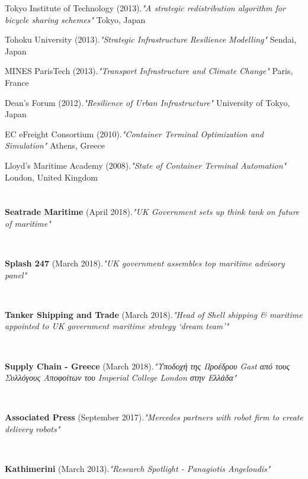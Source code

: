 \documentclass[margin]{res}
\begin{document}
\begin{resume}
\begin{etaremune}
	Tokyo Institute of Technology (2013).\textit{"{A strategic redistribution algorithm for bicycle sharing schemes}"} Tokyo, Japan
	\item
	Tohoku University (2013).\textit{"{Strategic Infrastructure Resilience Modelling}"} Sendai, Japan
	\item
	MINES ParisTech (2013).\textit{"{Transport Infrastructure and Climate Change}"} Paris, France
	\item
	Dean's Forum (2012).\textit{"{Resilience of Urban Infrastructure}"} University of Tokyo, Japan
	\item
	EC eFreight Consortium (2010).\textit{"{Container Terminal Optimization and Simulation}"} Athens, Greece
	\item
	Lloyd's Maritime Academy (2008).\textit{"{State of Container Terminal Automation}"} London, United Kingdom
\end{etaremune}

\section{}
	\begin{minipage}{\textwidth}
	{\bf Seatrade Maritime} (April 2018).\textit{"{UK Government sets up think tank on future of maritime}"}	\end{minipage}
	\\
	\begin{minipage}{\textwidth}
	{\bf Splash 247} (March 2018).\textit{"{UK government assembles top maritime advisory panel}"}	\end{minipage}
	\\
	\begin{minipage}{\textwidth}
	{\bf Tanker Shipping and Trade} (March 2018).\textit{"{Head of Shell shipping \& maritime appointed to UK government maritime strategy ‘dream team’}"}	\end{minipage}
	\\
	\begin{minipage}{\textwidth}
	{\bf Supply Chain - Greece} (March 2018).\textit{"{Υποδοχή της Προέδρου Gast από τους Συλλόγους Αποφοίτων του Imperial College London στην Ελλάδα}"}	\end{minipage}
	\\
	\begin{minipage}{\textwidth}
	{\bf Associated Press} (September 2017).\textit{"{Mercedes partners with robot firm to create delivery robots}"}	\end{minipage}
	\\
	\begin{minipage}{\textwidth}
	{\bf Kathimerini} (March 2013).\textit{"{Research Spotlight - Panagiotis Angeloudis}"}	\end{minipage}
	\\

\end{resume}
\end{document}
